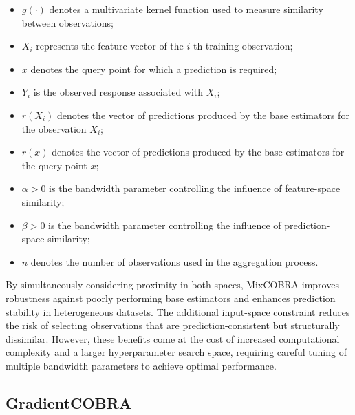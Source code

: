 \begin{itemize}    
    \item \(g(\cdot)\) denotes a multivariate kernel function used to measure similarity between observations;
          
    \item \(X_i\) represents the feature vector of the \(i\)-th training observation;
          
    \item \(x\) denotes the query point for which a prediction is required;
          
    \item \(Y_i\) is the observed response associated with \(X_i\);
          
    \item \(r(X_i)\) denotes the vector of predictions produced by the base estimators for the observation \(X_i\);
          
    \item \(r(x)\) denotes the vector of predictions produced by the base estimators for the query point \(x\);
          
    \item \(\alpha > 0\) is the bandwidth parameter controlling the influence of feature-space similarity;
          
    \item \(\beta > 0\) is the bandwidth parameter controlling the influence of prediction-space similarity;
          
    \item \(n\) denotes the number of observations used in the aggregation process.
\end{itemize}

By simultaneously considering proximity in both spaces, MixCOBRA improves robustness against poorly performing base estimators and enhances prediction stability in heterogeneous datasets. The additional input-space constraint reduces the risk of selecting observations that are prediction-consistent but structurally dissimilar. However, these benefits come at the cost of increased computational complexity and a larger hyperparameter search space, requiring careful tuning of multiple bandwidth parameters to achieve optimal performance.


\subsection{GradientCOBRA}

